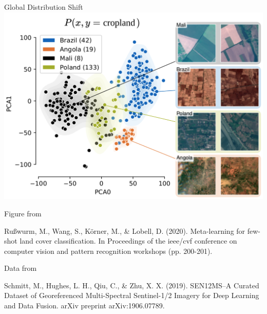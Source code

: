 \documentclass[11pt]{beamer}
\newcommand{\citeapa}[1]{ {\tiny#1\par} }
\begin{document}
	\begin{frame}{Global Distribution Shift}
		\includegraphics[width=.9\textwidth]{images/Sen12ms_distribution_shift}
		
		\scriptsize
		Figure from
		
		\citeapa{Rußwurm, M., Wang, S., Körner, M., \& Lobell, D. (2020). Meta-learning for few-shot land cover classification. In Proceedings of the ieee/cvf conference on computer vision and pattern recognition workshops (pp. 200-201).}
		
		\scriptsize
		Data from
		
		\citeapa{Schmitt, M., Hughes, L. H., Qiu, C., \& Zhu, X. X. (2019). SEN12MS--A Curated Dataset of Georeferenced Multi-Spectral Sentinel-1/2 Imagery for Deep Learning and Data Fusion. arXiv preprint arXiv:1906.07789.}
	\end{frame}
	
\end{document}
